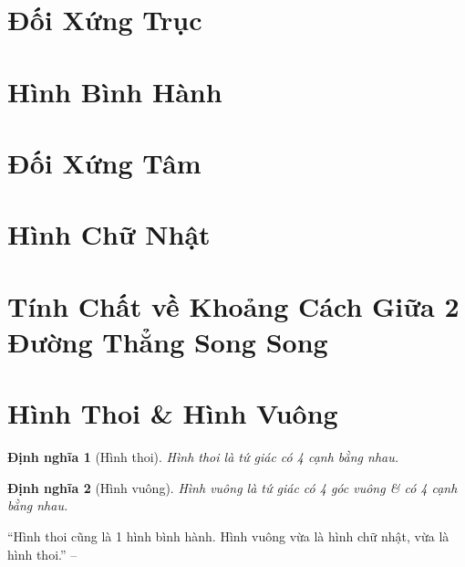 \documentclass{article}
\numberwithin{equation}{section}
\newtheorem{dinhnghia}{Định nghĩa}[section]
\begin{document}

\section{Đối Xứng Trục}


\section{Hình Bình Hành}


\section{Đối Xứng Tâm}


\section{Hình Chữ Nhật}


\section{Tính Chất về Khoảng Cách Giữa 2 Đường Thẳng Song Song}


\section{Hình Thoi \& Hình Vuông}

\begin{dinhnghia}[Hình thoi]
	\emph{Hình thoi} là tứ giác có 4 cạnh bằng nhau.
\end{dinhnghia}

\begin{dinhnghia}[Hình vuông]
	\emph{Hình vuông} là tứ giác có 4 góc vuông \& có 4 cạnh bằng nhau.
\end{dinhnghia}
``Hình thoi cũng là 1 hình bình hành. Hình vuông vừa là hình chữ nhật, vừa là hình thoi.'' -- \cite[p. 119]{Tuyen_Toan_8}
\end{document}
